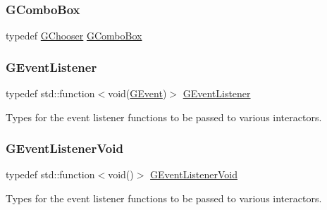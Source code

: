 \mbox{\label{namespacesgl_ab0f3b803fb5fee40d956ceafc1c1c162}} 
\subsubsection{\texorpdfstring{G\+Combo\+Box}{GComboBox}}
{\footnotesize\ttfamily typedef \mbox{\hyperlink{classsgl_1_1GChooser}{G\+Chooser}} \mbox{\hyperlink{namespacesgl_ab0f3b803fb5fee40d956ceafc1c1c162}{G\+Combo\+Box}}}

\mbox{\label{namespacesgl_ae9f3e9eab70035da1a2b114e21357b25}} 
\subsubsection{\texorpdfstring{G\+Event\+Listener}{GEventListener}}
{\footnotesize\ttfamily typedef std\+::function$<$void(\mbox{\hyperlink{classsgl_1_1GEvent}{G\+Event}})$>$ \mbox{\hyperlink{namespacesgl_ae9f3e9eab70035da1a2b114e21357b25}{G\+Event\+Listener}}}



Types for the event listener functions to be passed to various interactors. 

\mbox{\label{namespacesgl_a54427ce97bb1c2804e4fe2b0a62e8b17}} 
\subsubsection{\texorpdfstring{G\+Event\+Listener\+Void}{GEventListenerVoid}}
{\footnotesize\ttfamily typedef std\+::function$<$void()$>$ \mbox{\hyperlink{namespacesgl_a54427ce97bb1c2804e4fe2b0a62e8b17}{G\+Event\+Listener\+Void}}}



Types for the event listener functions to be passed to various interactors. 

\mbox{\label{namespacesgl_a4cc871eb91ac48c4d61ecb1dca7dc927}} 
